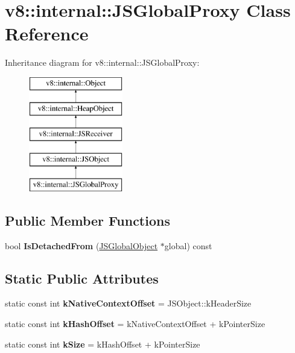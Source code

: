 \hypertarget{classv8_1_1internal_1_1_j_s_global_proxy}{}\section{v8\+:\+:internal\+:\+:J\+S\+Global\+Proxy Class Reference}
\label{classv8_1_1internal_1_1_j_s_global_proxy}
Inheritance diagram for v8\+:\+:internal\+:\+:J\+S\+Global\+Proxy\+:\begin{figure}[H]
\begin{center}
\leavevmode
\includegraphics[height=5.000000cm]{classv8_1_1internal_1_1_j_s_global_proxy}
\end{center}
\end{figure}
\subsection*{Public Member Functions}
\begin{DoxyCompactItemize}
\item 
bool {\bfseries Is\+Detached\+From} (\hyperlink{classv8_1_1internal_1_1_j_s_global_object}{J\+S\+Global\+Object} $\ast$global) const \hypertarget{classv8_1_1internal_1_1_j_s_global_proxy_aca2087543461f1498b7753204c325063}{}\label{classv8_1_1internal_1_1_j_s_global_proxy_aca2087543461f1498b7753204c325063}

\end{DoxyCompactItemize}
\subsection*{Static Public Attributes}
\begin{DoxyCompactItemize}
\item 
static const int {\bfseries k\+Native\+Context\+Offset} = J\+S\+Object\+::k\+Header\+Size\hypertarget{classv8_1_1internal_1_1_j_s_global_proxy_a8636791b0b48721886318cbda1674872}{}\label{classv8_1_1internal_1_1_j_s_global_proxy_a8636791b0b48721886318cbda1674872}

\item 
static const int {\bfseries k\+Hash\+Offset} = k\+Native\+Context\+Offset + k\+Pointer\+Size\hypertarget{classv8_1_1internal_1_1_j_s_global_proxy_a7ee9d52ce8e294b286fd3172a91d0b33}{}\label{classv8_1_1internal_1_1_j_s_global_proxy_a7ee9d52ce8e294b286fd3172a91d0b33}

\item 
static const int {\bfseries k\+Size} = k\+Hash\+Offset + k\+Pointer\+Size\hypertarget{classv8_1_1internal_1_1_j_s_global_proxy_a27f9783972c70443622c9869d720f5f5}{}\label{classv8_1_1internal_1_1_j_s_global_proxy_a27f9783972c70443622c9869d720f5f5}

\end{DoxyCompactItemize}
